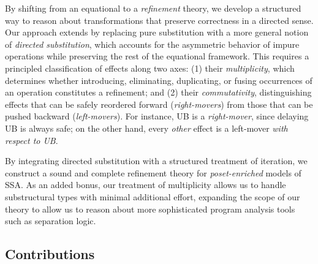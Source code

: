 \documentclass[acmsmall,screen,review]{acmart}
\begin{document}
By shifting from an equational to a \emph{refinement} theory, we develop a structured way to reason
about transformations that preserve correctness in a directed sense. Our approach extends
\citet{ghalayini-24-ssa-densem-arxiv} by replacing pure substitution with a more general notion of
\emph{directed substitution}, which accounts for the asymmetric behavior of impure operations while
preserving the rest of the equational framework. This requires a principled classification of
effects along two axes: (1) their \emph{multiplicity}, which determines whether introducing,
eliminating, duplicating, or fusing occurrences of an operation constitutes a refinement; and (2)
their \emph{commutativity}, distinguishing effects that can be safely reordered forward
(\emph{right-movers}) from those that can be pushed backward (\emph{left-movers}). For instance, UB
is a \emph{right-mover}, since delaying UB is always safe; on the other hand, every \emph{other}
effect is a left-mover \emph{with respect to UB}.

By integrating directed substitution with a structured treatment of iteration, we construct a sound
and complete refinement theory for \emph{poset-enriched} models of SSA. As an added bonus, our
treatment of multiplicity allows us to handle substructural types with minimal additional effort,
expanding the scope of our theory to allow us to reason about more sophisticated program analysis
tools such as separation logic.

\subsection{Contributions}
\end{document}
